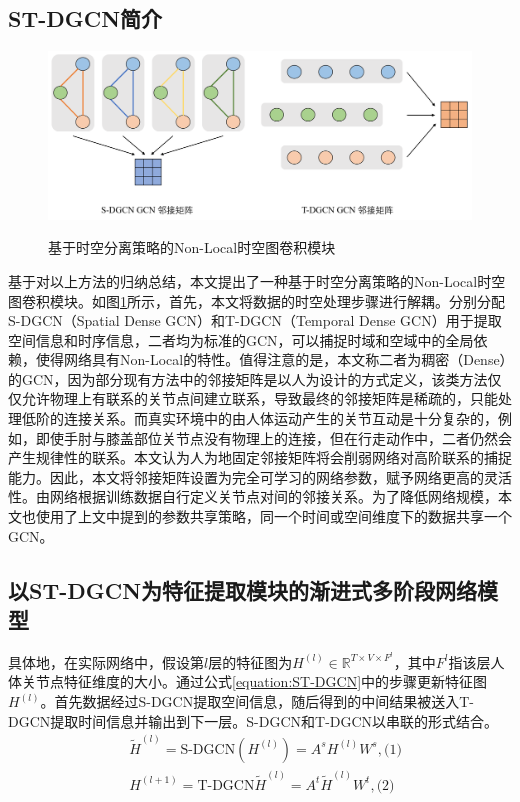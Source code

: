 \subsection{ST-DGCN简介}
\begin{figure}[ht]
    \centering
    \includegraphics[width=1\textwidth]{FigMa/Our_gcn.png}\\
    \vspace{-0.3cm}
    \caption{基于时空分离策略的Non-Local时空图卷积模块}
    \label{fig:Our_gcn_structure}
\end{figure}
基于对以上方法的归纳总结，本文提出了一种基于时空分离策略的Non-Local时空图卷积模块。如图\ref{fig:Our_gcn_structure}所示，首先，本文将数据的时空处理步骤进行解耦。分别分配S-DGCN（Spatial Dense GCN）和T-DGCN（Temporal Dense GCN）用于提取空间信息和时序信息，二者均为标准的GCN，可以捕捉时域和空域中的全局依赖，使得网络具有Non-Local的特性。值得注意的是，本文称二者为稠密（Dense）的GCN，因为部分现有方法\parencite{cui2020learning}中的邻接矩阵是以人为设计的方式定义，该类方法仅仅允许物理上有联系的关节点间建立联系，导致最终的邻接矩阵是稀疏的，只能处理低阶的连接关系。而真实环境中的由人体运动产生的关节互动是十分复杂的，例如，即使手肘与膝盖部位关节点没有物理上的连接，但在行走动作中，二者仍然会产生规律性的联系。本文认为人为地固定邻接矩阵将会削弱网络对高阶联系的捕捉能力。因此，本文将邻接矩阵设置为完全可学习的网络参数，赋予网络更高的灵活性。由网络根据训练数据自行定义关节点对间的邻接关系。为了降低网络规模，本文也使用了上文中提到的参数共享策略，同一个时间或空间维度下的数据共享一个GCN。

\subsection{以ST-DGCN为特征提取模块的渐进式多阶段网络模型}
具体地，在实际网络中，假设第$l$层的特征图为${H}^{(l)}\in \mathbb{R}^{T\times V \times F^l}$，其中$F^l$指该层人体关节点特征维度的大小。通过公式\ref{equation:ST-DGCN}中的步骤更新特征图${H}^{(l)}$。首先数据经过S-DGCN提取空间信息，随后得到的中间结果被送入T-DGCN提取时间信息并输出到下一层。S-DGCN和T-DGCN以串联的形式结合。
\begin{equation}
    \begin{aligned}
        & {\widetilde{H}^{(l)}} = \text{S-DGCN}(H^{(l)}) = A^s H^{(l)} W^s, \text{(1)}
        \\
        & H^{(l+1)} = \text{T-DGCN}{\widetilde{H}^{(l)}} = A^t {\widetilde{H}^{(l)}} W^t, \text{(2)}
    \end{aligned}
    \label{equation:ST-DGCN}
\end{equation}

